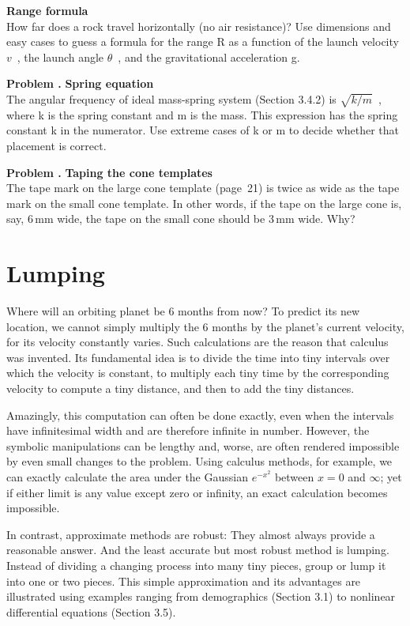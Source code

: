 \documentclass[fleqn]{book}
\newcounter{pro1}
\newcommand{\pro}{\par\addtocounter{pro1}{1}%
\textbf{Problem \arabic{chapter}.\arabic{pro1} }\quad}
\begin{document}
\textbf{Range formula}\\
\hangindent=-3cm
How far does a rock travel horizontally (no air resistance)?
Use dimensions and easy cases to guess a formula for the
range R as a function of the launch velocity $v$~, the launch angle $\theta$~, and the gravitational acceleration g.\\
\pro
\textbf{Spring equation}\\
The angular frequency of ideal mass-spring system (Section 3.4.2) is $\sqrt{k/m}$~, where k is the spring constant and m is the mass.
This expression has the spring constant k in the numerator.
Use extreme cases of k or m to decide whether that placement is correct.\\
\pro
\textbf{Taping the cone templates}\\
The tape mark on the large cone template (page~21) is twice as wide as the tape
mark on the small cone template.
In other words, if the tape on the large cone is, say, 6\,mm wide, the tape on the small cone should be 3\,mm wide.
Why?\newpage
\chapter{Lumping}
Where will an orbiting planet be 6 months from now?
To predict its new location, we cannot simply multiply the 6 months by the planet’s current velocity, for its velocity constantly varies.
Such calculations are the reason that calculus was invented.
Its fundamental idea is to divide the time into tiny intervals over which the velocity is constant, to multiply each tiny time by the corresponding velocity to compute a tiny distance, and then to add the tiny distances.

Amazingly, this computation can often be done exactly, even when the intervals have infinitesimal width and are therefore infinite in number.
However, the symbolic manipulations can be lengthy and, worse, are often rendered impossible by even small changes to the problem.
Using calculus methods, for example, we can exactly calculate the area under the Gaussian $e^{-x^2}$ between $x=0$ and $\infty$; yet if either limit is any value except zero or infinity, an exact calculation becomes impossible.

In contrast, approximate methods are robust: They almost always provide a reasonable answer.
And the least accurate but most robust method is lumping.
Instead of dividing a changing process into many tiny pieces, group or lump it into one or two pieces.
This simple approximation and its advantages are illustrated using examples ranging from demographics (Section 3.1) to nonlinear differential equations (Section 3.5).\newpage
\end{document}

